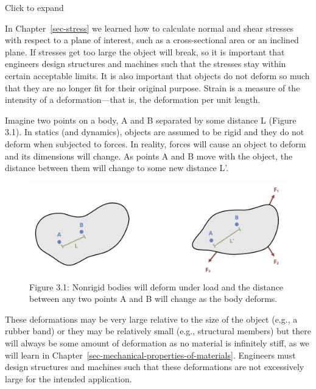 \documentclass[
  letterpaper,
  DIV=11,
  numbers=noendperiod]{scrreprt}
\theoremstyle{definition}
\theoremstyle{remark}
\begin{document}

Click to expand

In Chapter~\ref{sec-stress} we learned how to calculate normal and shear
stresses with respect to a plane of interest, such as a cross-sectional
area or an inclined plane. If stresses get too large the object will
break, so it is important that engineers design structures and machines
such that the stresses stay within certain acceptable limits. It is also
important that objects do not deform so much that they are no longer fit
for their original purpose. Strain is a measure of the intensity of a
deformation---that is, the deformation per unit length.

Imagine two points on a body, A and B separated by some distance L
(Figure 3.1). In statics (and dynamics), objects are assumed to be rigid
and they do not deform when subjected to forces. In reality, forces will
cause an object to deform and its dimensions will change. As points A
and B move with the object, the distance between them will change to
some new distance L'.

\begin{figure}[H]

{\centering \includegraphics{images/CH3 PNGs/figure 3.1.png}

}

\caption{Figure 3.1: Nonrigid bodies will deform under load and the
distance between any two points A and B will change as the body
deforms.}

\end{figure}%

These deformations may be very large relative to the size of the object
(e.g., a rubber band) or they may be relatively small (e.g., structural
members) but there will always be some amount of deformation as no
material is infinitely stiff, as we will learn in
Chapter~\ref{sec-mechanical-properties-of-materials}. Engineers must
design structures and machines such that these deformations are not
excessively large for the intended application.
\end{document}
